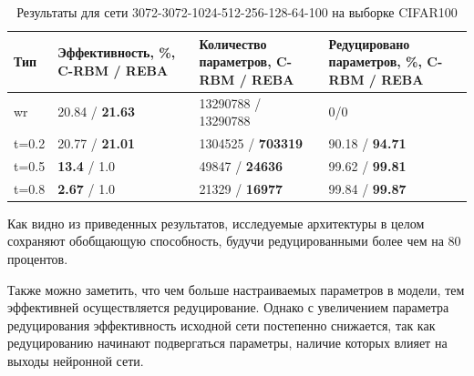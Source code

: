 \begin{table} [!h]
  \small
  \caption{Результаты для сети 3072-3072-1024-512-256-128-64-100 на выборке CIFAR100}\label{table:cifar_100}
\centering
\begin{tabular}{| p{2cm} | p{4cm} | p{4cm} | p{4cm} |}
  \hline
    \textbf{Тип} & \textbf{Эффективность, \%, C-RBM / REBA} & \textbf{Количество параметров, C-RBM / REBA} & \textbf{Редуцировано параметров, \%, C-RBM / REBA}\\
    \hline
    wr & 20.84 / \textbf{21.63} & 13290788 / 13290788 & 0/0\\
    \hline
    t=0.2 & 20.77 / \textbf{21.01} & 1304525 / \textbf{703319} & 90.18 / \textbf{94.71}\\
    \hline
    t=0.5 & \textbf{13.4} / 1.0 & 49847 / \textbf{24636} & 99.62 / \textbf{99.81}\\
    \hline
    t=0.8 & \textbf{2.67} / 1.0 & 21329 / \textbf{16977} & 99.84 / \textbf{99.87}\\
    \hline
\end{tabular}
\end{table}

Как видно из приведенных результатов, исследуемые архитектуры в целом сохраняют обобщающую способность, будучи редуцированными более чем на 80 процентов.

Также можно заметить, что чем больше настраиваемых параметров в модели, тем эффективней осуществляется редуцирование. Однако с увеличением параметра редуцирования эффективность исходной сети постепенно снижается, так как редуцированию начинают подвергаться параметры, наличие которых влияет на выходы нейронной сети.

